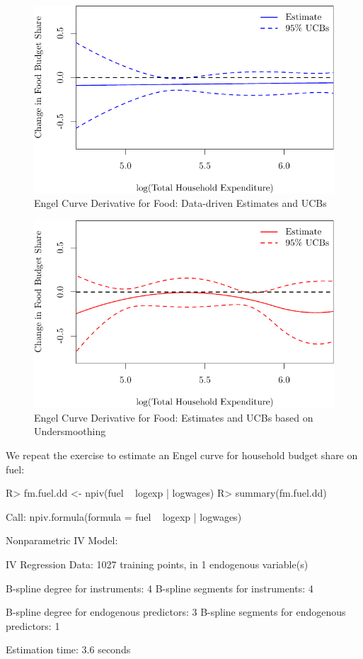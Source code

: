 \documentclass[
]{jss}
\begin{document}
\begin{figure}
\centering
\includegraphics{npiv_files/figure-latex/food-dd-deriv-1.pdf}
\caption{Engel Curve Derivative for Food: Data-driven Estimates and
UCBs}
\end{figure}

\begin{figure}
\centering
\includegraphics{npiv_files/figure-latex/food-det-deriv-1.pdf}
\caption{Engel Curve Derivative for Food: Estimates and UCBs based on
Undersmoothing}
\end{figure}

We repeat the exercise to estimate an Engel curve for household budget
share on fuel:

\begin{CodeChunk}
\begin{CodeInput}
R> fm.fuel.dd <- npiv(fuel ~ logexp | logwages)
R> summary(fm.fuel.dd)
\end{CodeInput}
\begin{CodeOutput}
Call:
npiv.formula(formula = fuel ~ logexp | logwages)

Nonparametric IV Model:

IV Regression Data: 1027 training points, in 1 endogenous variable(s)

B-spline degree for instruments:             4
B-spline segments for instruments:           4

B-spline degree for endogenous predictors:   3
B-spline segments for endogenous predictors: 1

Estimation time: 3.6 seconds
\end{CodeOutput}
\end{CodeChunk}
\end{document}
